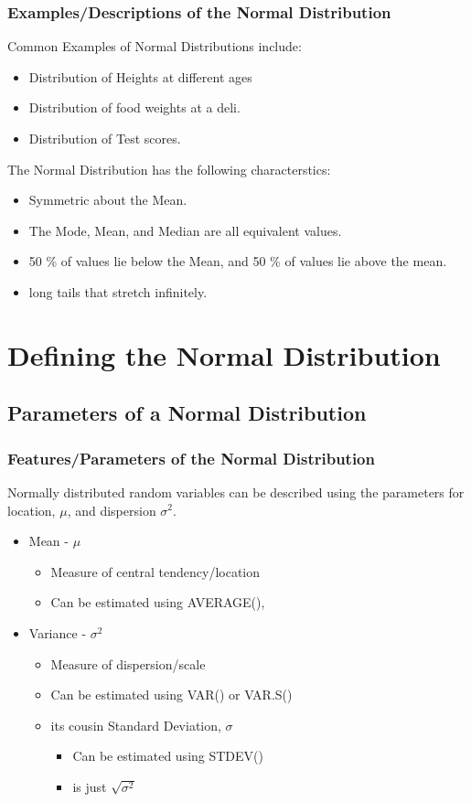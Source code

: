 \documentclass[12pt]{beamer}
\begin{document}
	\begin{frame}
		\frametitle{Examples/Descriptions of the Normal Distribution}
		Common Examples of Normal Distributions include:
		\begin{itemize}
			\item Distribution of Heights at different ages
			\item Distribution of food weights at a deli.  
			\item Distribution of Test scores. 
		\end{itemize}
	\bigskip
	The Normal Distribution has the following characterstics:
	\begin{itemize}
		\item Symmetric about the Mean.
		\item The Mode, Mean, and Median are all equivalent values.
		\item 50 \% of values lie below the Mean, and 50 \% of values lie above the mean.
		\item long tails that stretch infinitely. 
	\end{itemize}
	\end{frame}
\section{Defining the Normal Distribution}
	\subsection{Parameters of a Normal Distribution}
	\begin{frame}
		\frametitle{Features/Parameters of the Normal Distribution}
		
	Normally distributed random variables can be described using the parameters for location, $\mu$, and dispersion $\sigma^{2}$.
	\begin{itemize}
		\item Mean - $\mu$
		\begin{itemize}
			\item Measure of central tendency/location
			\item Can be estimated using AVERAGE(), 
		\end{itemize}
		\item Variance - $\sigma^2$
		\begin{itemize}
			\item Measure of dispersion/scale
			\item Can be estimated using VAR() or VAR.S()
			\item its cousin Standard Deviation, $\sigma$
			\begin{itemize}
				\item Can be estimated using STDEV()
				\item is just $\sqrt{\sigma^2}$
			\end{itemize}
		\end{itemize}
	\end{itemize}
	\end{frame}
\end{document}
